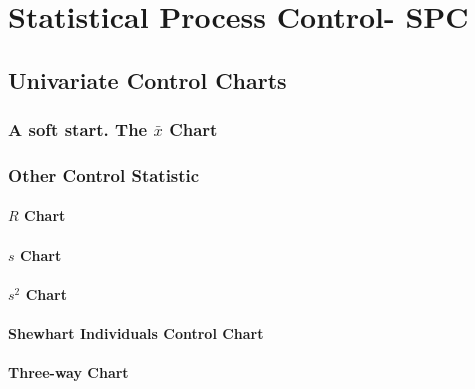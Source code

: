 \chapter{Statistical Process Control- SPC}
\label{sec:spc}




\section{Univariate Control Charts}




\subsection{A soft start. The $\bar{x}$ Chart}


\subsection{Other Control Statistic}
\subsubsection{$R$ Chart}
\subsubsection{$s$ Chart}
\subsubsection{$s^2$ Chart}
\subsubsection{Shewhart Individuals Control Chart}
\subsubsection{Three-way Chart}
